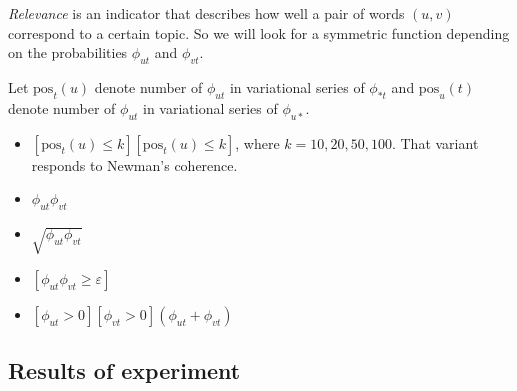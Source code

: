 \documentclass{article}
\begin{document}
\textit{Relevance} is an indicator that describes how well a pair of words $(u, v)$ correspond to a certain topic. 
So we will look for a symmetric function depending on the probabilities $\phi_{ut}$ and $\phi_{vt}$.

Let $\text{pos}_t(u)$ denote number of $\phi_{ut}$ in variational series of $\phi_{*t}$ and  $\text{pos}_u(t)$ denote number of $\phi_{ut}$ in variational series of $\phi_{u*}$.

\begin{itemize}
    \item $[\text{pos}_t(u) \le k][\text{pos}_t(u) \le k]$, where $k = 10, 20, 50, 100$. That variant responds to Newman's coherence.
    \item $\phi_{ut} \phi_{vt}$
    \item $\sqrt{\phi_{ut} \phi_{vt}}$
    \item $[\phi_{ut} \phi_{vt} \ge \varepsilon]$
    \item $[\phi_{ut} > 0] [\phi_{vt} > 0] (\phi_{ut} + \phi_{vt})$
     
\end{itemize}

\subsection{Results of experiment}
\end{document}
